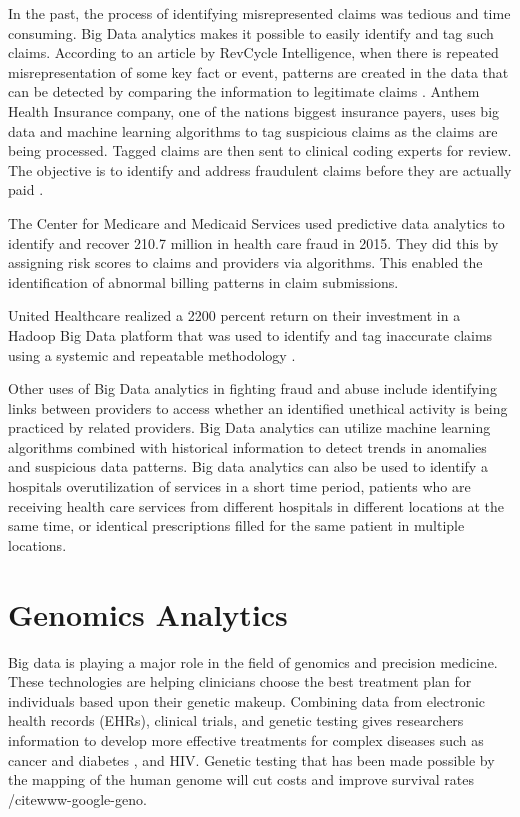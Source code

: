 \documentclass[sigconf]{acmart}
\begin{document}
In the past, the process of identifying misrepresented claims was tedious and time consuming.  Big Data analytics makes it possible to easily identify and tag such claims.  According to an article by RevCycle Intelligence, when there is repeated misrepresentation of some key fact or event, patterns are created in the data that can be detected by comparing the information to legitimate claims \cite{www-google-datameer}.  Anthem Health Insurance company, one of the nations biggest insurance payers, uses big data and machine learning algorithms to tag suspicious claims as the claims are being processed.  Tagged claims are then sent to clinical coding experts for review. The objective is to identify and address fraudulent claims before they are actually paid \cite{www-google-datameer}.

The Center for Medicare and Medicaid Services used predictive data analytics to identify and recover 210.7 million in health care fraud in 2015. They did this by assigning risk scores to claims and providers via algorithms. This enabled the identification of abnormal billing patterns in claim submissions.  

United Healthcare realized a 2200 percent return on their investment in a Hadoop Big Data platform that was used to identify and tag inaccurate claims using a systemic and repeatable methodology \cite{www-google-McDonald}.

Other uses of Big Data analytics in fighting fraud and abuse include identifying links between providers to access whether an identified unethical activity is being practiced by related providers.  Big Data analytics can utilize machine learning algorithms combined with historical information to detect trends in anomalies and suspicious data patterns. Big data analytics can also be used to identify a hospitals overutilization of services in a short time period, patients who are receiving health care services from different hospitals in different locations at the same time, or identical prescriptions filled for the same patient in multiple locations. 

  
\section{Genomics Analytics}
Big data is playing a major role in the field of genomics and precision medicine. These technologies are helping clinicians choose the best treatment plan for individuals based upon their genetic makeup. Combining data from electronic health records (EHRs), clinical trials, and genetic testing gives researchers information to develop more effective treatments for complex diseases such as cancer and diabetes \cite{www-google-pacient}, and HIV.  Genetic testing that has been made possible by the mapping of the human genome will cut costs and improve survival rates /cite{www-google-geno}.
\end{document}
